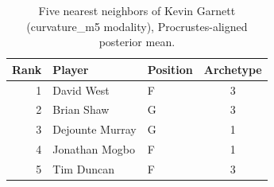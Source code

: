 \begin{table}[htbp]
  \centering\small
  \begin{tabular}{rllc}
    \toprule
    Rank & Player & Position & Archetype \\
    \midrule
    1 & David West & F & 3 \\
    2 & Brian Shaw & G & 3 \\
    3 & Dejounte Murray & G & 1 \\
    4 & Jonathan Mogbo & F & 1 \\
    5 & Tim Duncan & F & 3 \\
    \bottomrule
  \end{tabular}
  \caption{Five nearest neighbors of Kevin Garnett (curvature_m5 modality), Procrustes-aligned posterior mean.}
  \label{tab:Kevin_Garnett_neighbors_curvature_m5}
\end{table}

